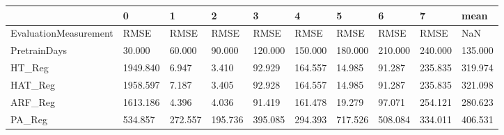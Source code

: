 \begin{tabular}{llllllllll}
\toprule
{} &        0 &       1 &       2 &       3 &       4 &       5 &       6 &       7 &    mean \\
\midrule
EvaluationMeasurement &     RMSE &    RMSE &    RMSE &    RMSE &    RMSE &    RMSE &    RMSE &    RMSE &     NaN \\
PretrainDays          &   30.000 &  60.000 &  90.000 & 120.000 & 150.000 & 180.000 & 210.000 & 240.000 & 135.000 \\
HT\_Reg                & 1949.840 &   6.947 &   3.410 &  92.929 & 164.557 &  14.985 &  91.287 & 235.835 & 319.974 \\
HAT\_Reg               & 1958.597 &   7.187 &   3.405 &  92.928 & 164.557 &  14.985 &  91.287 & 235.835 & 321.098 \\
ARF\_Reg               & 1613.186 &   4.396 &   4.036 &  91.419 & 161.478 &  19.279 &  97.071 & 254.121 & 280.623 \\
PA\_Reg                &  534.857 & 272.557 & 195.736 & 395.085 & 294.393 & 717.526 & 508.084 & 334.011 & 406.531 \\
\bottomrule
\end{tabular}
